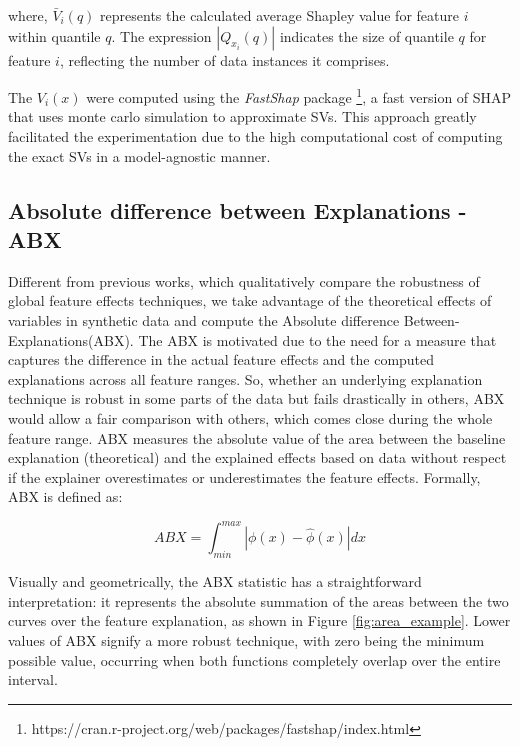 where, \(\bar{V}_{i}(q)\) represents the calculated average Shapley value for feature \(i\) within quantile \(q\). The expression \(|Q_{x_i}(q)|\) indicates the size of quantile \(q\) for feature \(i\), reflecting the number of data instances it comprises. 

The \(V_i(x)\) were computed using the \textit{FastShap} package \footnote{https://cran.r-project.org/web/packages/fastshap/index.html}, a fast version of SHAP that uses monte carlo simulation to approximate SVs. This approach greatly facilitated the experimentation due to the high computational cost of computing the exact SVs in a model-agnostic manner. 

\subsection{Absolute difference between Explanations - ABX}

Different from previous works, which qualitatively compare the robustness of global feature effects techniques, we take advantage of the theoretical effects of variables in synthetic data and compute the Absolute difference Between-Explanations(ABX). The ABX is motivated due to the need for a measure that captures the difference in the actual feature effects and the computed explanations across all feature ranges. So, whether an underlying explanation technique is robust in some parts of the data but fails drastically in others, ABX would allow a fair comparison with others, which comes close during the whole feature range. ABX measures the absolute value of the area between the baseline explanation (theoretical) and the explained effects based on data without respect if the explainer overestimates or underestimates the feature effects. Formally, ABX is defined as:

\begin{equation}
ABX = \int_{min}^{max} |\phi(x) - \hat{\phi}(x)| dx
\label{abx}
\end{equation}

Visually and geometrically, the ABX statistic has a straightforward interpretation: it represents the absolute summation of the areas between the two curves over the feature explanation, as shown in Figure \ref{fig:area_example}.  Lower values of ABX signify a more robust technique, with zero being the minimum possible value, occurring when both functions completely overlap over the entire interval.

